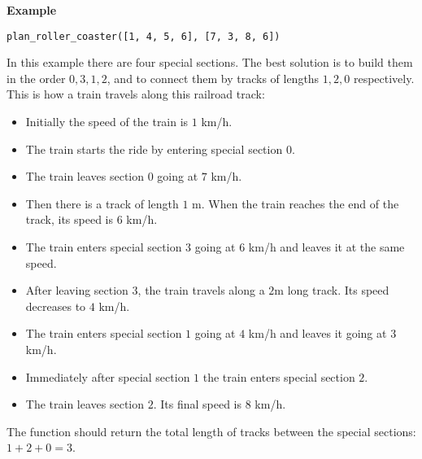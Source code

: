 \textbf{Example}

\texttt{plan\_roller\_coaster([1, 4, 5, 6], [7, 3, 8, 6])}

In this example there are four special sections. The best solution is to build them in the order $0, 3, 1, 2$, and to connect them by tracks of lengths $1, 2, 0$ respectively. This is how a train travels along this railroad track:

\begin{itemize}
\item Initially the speed of the train is $1$ km/h.
\item The train starts the ride by entering special section $0$.
\item The train leaves section $0$ going at $7$ km/h.
\item Then there is a track of length $1$ m. When the train reaches the end of the track, its speed is $6$ km/h.
\item The train enters special section $3$ going at $6$ km/h and leaves it at the same speed.
\item After leaving section $3$, the train travels along a $2$m long track. Its speed decreases to $4$ km/h.
\item The train enters special section $1$ going at $4$ km/h and leaves it going at $3$ km/h.
\item Immediately after special section $1$ the train enters special section $2$.
\item The train leaves section $2$. Its final speed is $8$ km/h.
\end{itemize}

The function should return the total length of tracks between the special sections: $1 + 2 + 0 = 3$.